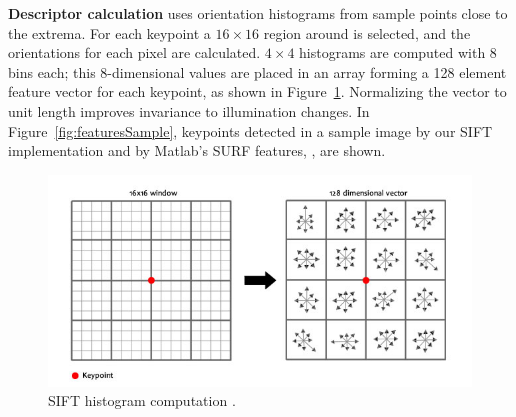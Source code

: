 \documentclass[12pt]{article}
\begin{document}
\textbf{Descriptor calculation} uses orientation histograms from sample points close to the extrema.
For each keypoint a $16 \times 16$ region around is selected, and the orientations for each pixel are calculated.
$4 \times 4$ histograms are computed with 8 bins each; this 8-dimensional values are placed in an array forming a 128 element feature vector for each keypoint, as shown in Figure~\ref{fig:histoCal}.
Normalizing the vector to unit length improves invariance to illumination changes.
In Figure~\ref{fig:featuresSample}, keypoints detected in a sample image by our SIFT implementation and by Matlab's SURF features, \cite{Bay2006}, are shown.

\begin{figure}[htbp!]
	\centering
	\includegraphics[scale=0.43]{images/siftHistograms}
	\caption{SIFT histogram computation \cite{Gu2013}.}
	\label{fig:histoCal}
\end{figure}
\end{document}
